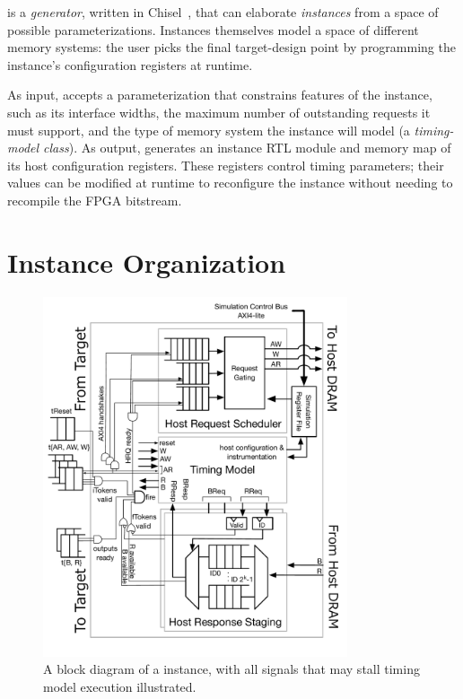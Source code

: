 \PNAME is a \textit{generator}, written in Chisel~\cite{Chisel}, that can
elaborate \textit{instances} from a space of possible parameterizations.
Instances themselves model a space of different memory systems: the user picks the
final target-design point by programming the instance's configuration registers
at runtime.

As input, \PNAME accepts a parameterization that constrains features
of the instance, such as its interface widths, the maximum number of
outstanding requests it must support, and the type of memory system the
instance will model (a \emph{timing-model class}). As output, \PNAME generates
an instance RTL module and memory map of its host configuration registers. These
registers control timing parameters; their values can be modified at runtime
to reconfigure the instance without needing to recompile the FPGA bitstream.

\section{Instance Organization}

\begin{figure}[t]
	\centering
	\includegraphics[width=0.8\textwidth]{figures/memory-model-block-diagram.pdf}
    \caption{A block diagram of a \PNAME instance, with all signals
    that may stall timing model execution illustrated.}
	\label{fig:timing-model}
\end{figure}

